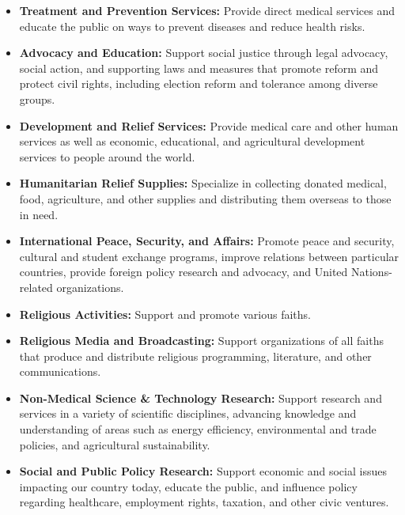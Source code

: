 \begin{itemize}
    \item \textbf{Treatment and Prevention Services:} Provide direct medical services and educate the public on ways to prevent diseases and reduce health risks.
    \item \textbf{Advocacy and Education:} Support social justice through legal advocacy, social action, and supporting laws and measures that promote reform and protect civil rights, including election reform and tolerance among diverse groups.
    \item \textbf{Development and Relief Services:} Provide medical care and other human services as well as economic, educational, and agricultural development services to people around the world.
    \item \textbf{Humanitarian Relief Supplies:} Specialize in collecting donated medical, food, agriculture, and other supplies and distributing them overseas to those in need.
    \item \textbf{International Peace, Security, and Affairs:} Promote peace and security, cultural and student exchange programs, improve relations between particular countries, provide foreign policy research and advocacy, and United Nations-related organizations.
    \item \textbf{Religious Activities:} Support and promote various faiths.
    \item \textbf{Religious Media and Broadcasting:} Support organizations of all faiths that produce and distribute religious programming, literature, and other communications.
    \item \textbf{Non-Medical Science \& Technology Research:} Support research and services in a variety of scientific disciplines, advancing knowledge and understanding of areas such as energy efficiency, environmental and trade policies, and agricultural sustainability.
    \item \textbf{Social and Public Policy Research:} Support economic and social issues impacting our country today, educate the public, and influence policy regarding healthcare, employment rights, taxation, and other civic ventures.
\end{itemize}


